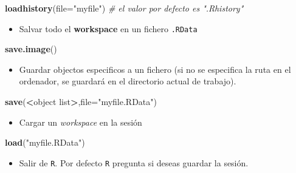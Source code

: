 \documentclass[]{book}
\newenvironment{Shaded}{\begin{snugshade}}{\end{snugshade}}
\newcommand{\KeywordTok}[1]{\textcolor[rgb]{0.13,0.29,0.53}{\textbf{#1}}}
\newcommand{\DataTypeTok}[1]{\textcolor[rgb]{0.13,0.29,0.53}{#1}}
\newcommand{\StringTok}[1]{\textcolor[rgb]{0.31,0.60,0.02}{#1}}
\newcommand{\CommentTok}[1]{\textcolor[rgb]{0.56,0.35,0.01}{\textit{#1}}}
\newcommand{\OperatorTok}[1]{\textcolor[rgb]{0.81,0.36,0.00}{\textbf{#1}}}
\newcommand{\NormalTok}[1]{#1}
\providecommand{\tightlist}{%
  \setlength{\itemsep}{0pt}\setlength{\parskip}{0pt}}
\begin{document}
\begin{Shaded}
\begin{Highlighting}[]
\KeywordTok{loadhistory}\NormalTok{(}\DataTypeTok{file=}\StringTok{"myfile"}\NormalTok{) }\CommentTok{# el valor por defecto es ".Rhistory"}
\end{Highlighting}
\end{Shaded}

\begin{itemize}
\tightlist
\item
  Salvar todo el \textbf{workspace} en un fichero \texttt{.RData}
\end{itemize}

\begin{Shaded}
\begin{Highlighting}[]
\KeywordTok{save.image}\NormalTok{()}
\end{Highlighting}
\end{Shaded}

\begin{itemize}
\tightlist
\item
  Guardar objectos especificos a un fichero (si no se especifica la ruta
  en el ordenador, se guardará en el directorio actual de trabajo).
\end{itemize}

\begin{Shaded}
\begin{Highlighting}[]
\KeywordTok{save}\NormalTok{(}\OperatorTok{<}\NormalTok{object list}\OperatorTok{>}\NormalTok{,}\DataTypeTok{file=}\StringTok{"myfile.RData"}\NormalTok{) }
\end{Highlighting}
\end{Shaded}

\begin{itemize}
\tightlist
\item
  Cargar un \emph{workspace} en la sesión
\end{itemize}

\begin{Shaded}
\begin{Highlighting}[]
\KeywordTok{load}\NormalTok{(}\StringTok{"myfile.RData"}\NormalTok{) }
\end{Highlighting}
\end{Shaded}

\begin{itemize}
\tightlist
\item
  Salir de \texttt{R}. Por defecto \texttt{R} pregunta si deseas guardar
  la sesión.
\end{itemize}
\end{document}
